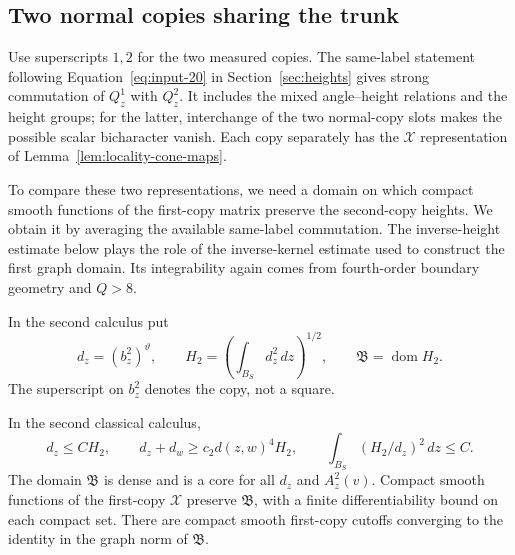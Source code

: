 \subsection{Two normal copies sharing the trunk}

Use superscripts $1,2$ for the two measured copies. The same-label
statement following Equation~\eqref{eq:input-20} in
Section~\ref{sec:heights} gives strong commutation of $Q_z^1$ with $Q_z^2$.
It includes the mixed angle--height relations and the height groups; for
the latter, interchange of the two normal-copy slots makes the possible
scalar bicharacter vanish. Each copy separately has the $\mathcal X$
representation of Lemma~\ref{lem:locality-cone-maps}.

To compare these two representations, we need a domain on which compact
smooth functions of the first-copy matrix preserve the second-copy
heights. We obtain it by averaging the available same-label commutation.
The inverse-height estimate below plays the role of the inverse-kernel
estimate used to construct the first graph domain. Its integrability
again comes from fourth-order boundary geometry and $Q>8$.

In the second calculus put
\[
 d_z=(b_z^2)^\vartheta,
 \qquad H_2=\left(\int_{B_S}d_z^2\,dz\right)^{1/2},
 \qquad \mathfrak B=\operatorname{dom}H_2.
\]
The superscript on $b_z^2$ denotes the copy, not a square.

\begin{lemma}
\label{lem:locality-two-copy-domain}
In the second classical calculus,
\begin{equation}
 d_z\le C H_2,\qquad
 d_z+d_w\ge c_2d(z,w)^4H_2,
 \qquad
 \int_{B_S}(H_2/d_z)^2\,dz\le C.
 \label{eq:locality-inverse-height}
\end{equation}
The domain $\mathfrak B$ is dense and is a core for all $d_z$ and
$A_z^2(v)$. Compact smooth functions of the first-copy $\mathcal X$
preserve $\mathfrak B$, with a finite differentiability bound on each
compact set. There are compact smooth first-copy cutoffs converging to
the identity in the graph norm of $\mathfrak B$.
\end{lemma}

